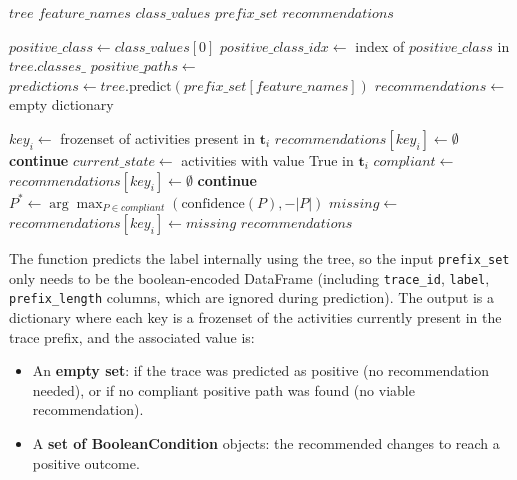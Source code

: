 \documentclass{article}
\begin{document}
\begin{algorithm}[H]
\caption{Extract Recommendations}
\label{alg:recommendations}
\begin{algorithmic}[1]
\Require $tree$ 
\Require $feature\_names$ 
\Require $class\_values$ 
\Require $prefix\_set$ 
\Ensure $recommendations$ 

\State $positive\_class \gets class\_values[0]$
\State $positive\_class\_idx \gets$ index of $positive\_class$ in $tree.classes\_$
\State $positive\_paths \gets$ 
\State $predictions \gets tree.\text{predict}(prefix\_set[feature\_names])$
\State $recommendations \gets$ empty dictionary

    \State $key_i \gets$ frozenset of activities present in $\mathbf{t}_i$
        \State $recommendations[key_i] \gets \emptyset$ 
        \State \textbf{continue}
    \EndIf
    \State $current\_state \gets$ activities with value True in $\mathbf{t}_i$
    \State $compliant \gets$ 
        \State $recommendations[key_i] \gets \emptyset$ 
        \State \textbf{continue}
    \EndIf
    \State $P^* \gets \arg\max_{P \in compliant} \left( \text{confidence}(P), -|P| \right)$
    \State $missing \gets$ 
    \State $recommendations[key_i] \gets missing$
\EndFor
\State \Return $recommendations$
\end{algorithmic}
\end{algorithm}

\noindent
The function predicts the label internally using the tree, so the input \texttt{prefix\_set} only needs to be the boolean-encoded DataFrame (including \texttt{trace\_id}, \texttt{label}, \texttt{prefix\_length} columns, which are ignored during prediction). The output is a dictionary where each key is a frozenset of the activities currently present in the trace prefix, and the associated value is:
\begin{itemize}
    \item An \textbf{empty set}: if the trace was predicted as positive (no recommendation needed), or if no compliant positive path was found (no viable recommendation).
    \item A \textbf{set of BooleanCondition} objects: the recommended changes to reach a positive outcome.
\end{itemize}
\end{document}
